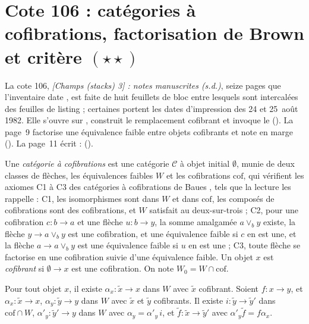 \section[Cote 106 : catégories à cofibrations, factorisation de Brown et critère $(\star\star)$]{Cote 106 : catégories à cofibrations, factorisation de Brown et critère $(\star\star)$\protect{}}\label{sec:106}

La cote 106, \emph{[Champs (stacks) 3] : notes manuscrites (s.d.)}, seize pages que l'inventaire date \q{[à partir de 1982]}, est faite de huit feuillets de bloc entre lesquels sont intercalées des feuilles de listing ; certaines portent les dates d'impression des 24 et 25~août 1982. Elle s'ouvre sur , construit le remplacement cofibrant et invoque le  (). La page~9 factorise une équivalence faible entre objets cofibrants et note en marge  (). La page~11 écrit :  ().

\begin{definition}
Une \emph{catégorie à cofibrations} est une catégorie $\mathcal C$ à objet initial $\emptyset$, munie de deux classes de flèches, les équivalences faibles $W$ et les cofibrations $\mathrm{cof}$, qui vérifient les axiomes C1 à C3 des catégories à cofibrations de Baues \cite{baues1989}, tels que la lecture les rappelle : C1, les isomorphismes sont dans $W$ et dans $\mathrm{cof}$, les composés de cofibrations sont des cofibrations, et $W$ satisfait au deux-sur-trois ; C2, pour une cofibration $c : b \to a$ et une flèche $u : b \to y$, la somme amalgamée $a \vee_b y$ existe, la flèche $y \to a \vee_b y$ est une cofibration, et une équivalence faible si $c$ en est une, et la flèche $a \to a \vee_b y$ est une équivalence faible si $u$ en est une ; C3, toute flèche se factorise en une cofibration suivie d'une équivalence faible. Un objet $x$ est \emph{cofibrant} si $\emptyset \to x$ est une cofibration. On note $W_0 = W \cap \mathrm{cof}$.
\end{definition}

\begin{enonce}
Pour tout objet $x$, il existe $\alpha_x : \widetilde x \to x$ dans $W$ avec $\widetilde x$ cofibrant. Soient $f : x \to y$, et $\alpha_x : \widetilde x \to x$, $\alpha_y : \widetilde y \to y$ dans $W$ avec $\widetilde x$ et $\widetilde y$ cofibrants. Il existe $i : \widetilde y \to \widetilde y'$ dans $\mathrm{cof} \cap W$, $\alpha'_y : \widetilde y' \to y$ dans $W$ avec $\alpha_y = \alpha'_y\, i$, et $\widetilde f : \widetilde x \to \widetilde y'$ avec $\alpha'_y \widetilde f = f \alpha_x$.
\end{enonce}

